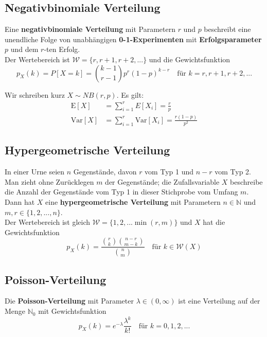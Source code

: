 \documentclass[11pt]{article}
\newcommand{\E}{\text{E}}
\newcommand{\Var}{\text{Var}}
\begin{document}
\subsection{Negativbinomiale Verteilung}

Eine \textbf{negativbinomiale Verteilung} mit Parametern $r$ und $p$ beschreibt eine unendliche Folge von unabhängigen \textbf{0-1-Experimenten} mit \textbf{Erfolgsparameter} $p$ und dem $r$-ten Erfolg. \\
Der Wertebereich ist $\mathcal{W} = \{r, r+1, r+2,...\}$ und die Gewichtsfunktion
\begin{equation*}
	p_X(k) = P[X = k] = \binom{k-1}{r-1}p^r(1-p)^{k-r} \quad\text{für } k = r, r+1, r+2, ...
\end{equation*}

Wir schreiben kurz $X \sim NB(r,p)$. Es gilt:
\begin{equation*}
\begin{split}
	\E[X] & = \sum_{i=1}^r E[X_i] = \frac{r}{p} \\
	\Var[X] & = \sum_{i=1}^r \Var[X_i] = \frac{r(1-p)}{p^2}
\end{split}
\end{equation*}

\subsection{Hypergeometrische Verteilung}

In einer Urne seien $n$ Gegenstände, davon $r$ vom Typ 1 und $n -r$ vom Typ 2. Man zieht ohne Zurücklegen $m$ der Gegenstände; die Zufallsvariable $X$ beschreibe die Anzahl der Gegenstände vom Typ 1 in dieser Stichprobe vom Umfang $m$. Dann hat $X$ eine \textbf{hypergeometrische Verteilung} mit Parametern $n \in \mathbb{N}$ und $m,r \in \{1, 2, ..., n\}$. \\
Der Wertebereich ist gleich $\mathcal{W} = \{1, 2,... \min(r, m)\}$ und $X$ hat die Gewichtsfunktion
\begin{equation*}
	p_X(k) = \frac{\binom{r}{k}\binom{n-r}{m-k}}{\binom{n}{m}} \quad \text{für } k \in \mathcal{W}(X)
\end{equation*}

\subsection{Poisson-Verteilung}

Die \textbf{Poisson-Verteilung} mit Parameter $\lambda \in (0, \infty)$ ist eine Verteilung auf der Menge $\mathbb{N}_0$ mit Gewichtsfunktion
\begin{equation*}
	p_X(k) = e^{-\lambda}\frac{\lambda^k}{k!}\quad\text{für } k = 0, 1, 2,...
\end{equation*}
\end{document}
